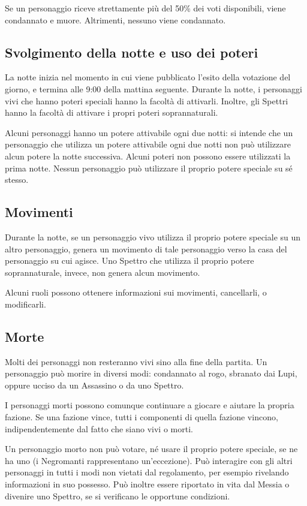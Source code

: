 \documentclass[a4paper,10pt]{article}
\begin{document}
Se un personaggio riceve strettamente più del 50\% dei voti disponibili, viene condannato e muore. Altrimenti, nessuno viene condannato.

\subsection{Svolgimento della notte e uso dei poteri}

La notte inizia nel momento in cui viene pubblicato l'esito della votazione del giorno, e termina alle 9:00 della mattina seguente. Durante la notte, i personaggi vivi che hanno poteri speciali hanno la facoltà di attivarli. Inoltre, gli Spettri hanno la facoltà di attivare i propri poteri soprannaturali.

Alcuni personaggi hanno un potere attivabile ogni due notti: si intende che un personaggio che utilizza un potere attivabile ogni due notti non può utilizzare alcun potere la notte successiva. Alcuni poteri non possono essere utilizzati la prima notte.
Nessun personaggio può utilizzare il proprio potere speciale su sé stesso.

\subsection{Movimenti}

Durante la notte, se un personaggio vivo utilizza il proprio potere speciale su un altro personaggio, genera un movimento di tale personaggio verso la casa del personaggio su cui agisce. Uno Spettro che utilizza il proprio potere soprannaturale, invece, non genera alcun movimento.

Alcuni ruoli possono ottenere informazioni sui movimenti, cancellarli, o modificarli.

\subsection{Morte}

Molti dei personaggi non resteranno vivi sino alla fine della partita. Un personaggio può morire in diversi modi: condannato al rogo, sbranato dai Lupi, oppure ucciso da un Assassino o da uno Spettro.

I personaggi morti possono comunque continuare a giocare e aiutare la propria fazione. Se una fazione vince, tutti i componenti di quella fazione vincono, indipendentemente dal fatto che siano vivi o morti.

Un personaggio morto non può votare, né usare il proprio potere speciale, se ne ha uno (i Negromanti rappresentano un'eccezione). Può interagire con gli altri personaggi in tutti i modi non vietati dal regolamento, per esempio rivelando informazioni in suo possesso. Può inoltre essere riportato in vita dal Messia o divenire uno Spettro, se si verificano le opportune condizioni.
\end{document}
